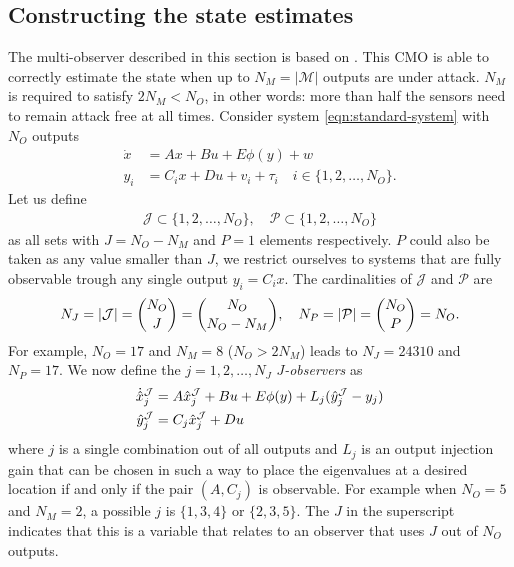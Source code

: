 \subsection{Constructing the state estimates}
\label{subsec:state-estimates}
The multi-observer described in this section is based on \cite[Section 3B]{Chong2015ObservabilityAttacks}. This CMO is able to correctly estimate the state when up to $N_M = |\mathcal{M}|$ outputs are under attack. $N_M$ is required to satisfy $2N_M<N_O$, in other words: more than half the sensors need to remain attack free at all times. Consider system \eqref{eqn:standard-system} with $N_O$ outputs
\begin{equation*}
    \begin{split}
    \dot{x} &= Ax + Bu + E\phi(y) + w \\
        y_i &= C_ix + Du + v_i + \tau_i \quad i  \in \{1,2,\dots,N_O\}.
    \end{split}
\end{equation*}
Let us define 
\begin{equation}\label{eqn:observer-sets}
    \begin{split}
        \mathcal{J} \subset \{1,2,\dots,N_O\}, \quad \mathcal{P} \subset \{1,2,\dots,N_O\}
    \end{split}
\end{equation}
 as all sets with  $J=N_O-N_M$ and  $P=1$ elements respectively. $P$ could also be taken as any value smaller than $J$, we restrict ourselves to systems that are fully observable trough any single output $y_i = C_ix$. The cardinalities of $\mathcal{J}$ and $\mathcal{P}$ are 
\begin{equation}\label{eqn:multi-observer-sizes}
    N_J = |\mathcal{J}|=\binom{N_O}{J}=\binom{N_O}{N_O-N_M}, \quad N_P = |\mathcal{P}| = \binom{N_O}{P} = N_O.
\end{equation}
For example, $N_O=17$ and $N_M=8$ ($N_O>2N_M$) leads to $N_J=24310$ and $N_P=17$.
We now define the $j=1,2,\dots,N_J$ $J$\textit{-observers} as
\begin{equation*}
    \begin{split}
        \dot{\hat{x}}_j^{\mathcal{J}} &= A\hat{x}_j^{\mathcal{J}} + Bu + E\phi(y) + L_j(\hat{y}_j^{\mathcal{J}} - y_j) \\
        \hat{y}_j^{\mathcal{J}} &= C_j\hat{x}_j^{\mathcal{J}} + Du
    \end{split}
\end{equation*}
where $j$ is a single combination out of all outputs and $L_j$ is an output injection gain that can be chosen in such a way to place the eigenvalues at a desired location if and only if the pair $(A,C_j)$ is observable. For example when $N_O=5$ and $N_M=2$, a possible $j$ is $\{1,3,4\}$ or $\{2,3,5\}$. The $J$ in the superscript indicates that this is a variable that relates to an observer that uses $J$ out of $N_O$ outputs.
